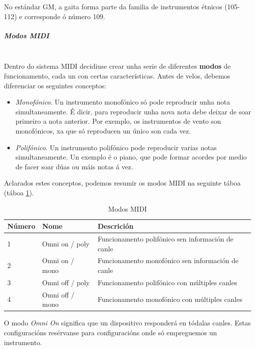     No estándar GM, a gaita forma parte da familia de instrumentos étnicos
    (105-112) e corresponde ó número 109.

    \subparagraph{Modos MIDI}\mbox{}\\

    Dentro do sistema MIDI decidiuse crear unha serie de diferentes
    \textbf{modos} de funcionamento, cada un con certas características. Antes
    de velos, debemos diferenciar os seguintes conceptos:

    \begin{itemize}
     \item \textit{Monofónico}. Un instrumento monofónico só pode reproducir
           unha nota simultaneamente. É dicir, para reproducir unha nova nota
           debe deixar de soar primeiro a nota anterior. Por exemplo, os
           instrumentos de vento son monofónicos, xa que só reproducen un único
           son cada vez.
     \item \textit{Polifónico}. Un instrumento polifónico pode reproducir
           varias notas simultaneamente. Un exemplo é o piano, que pode formar
           acordes por medio de facer soar dúas ou máis notas á vez.
    \end{itemize}

    Aclarados estes conceptos, podemos resumir os modos MIDI na seguinte táboa
    (táboa \ref{tabla:WikipediaModosMIDI}). \\

    \begin{table}[htbp]
     \centering
     \begin{tabular}{|l|l|l|}
      \hline
      \textbf{Número} & \textbf{Nome} & \textbf{Descrición} \\
      \hline
      1 & Omni on / poly & Funcionamento polifónico sen información de canle \\
      \hline
      2 & Omni on / mono & Funcionamento monofónico sen información de canle \\
      \hline
      3 & Omni off / poly & Funcionamento polifónico con múltiples canles \\
      \hline
      4 & Omni off / mono & Funcionamento monofónico con múltiples canles \\
      \hline
     \end{tabular}
     \caption{Modos MIDI}
     \label{tabla:WikipediaModosMIDI}  
    \end{table}

    O modo \textit{Omni On} significa que un dispositivo responderá en tódalas
    canles. Estas configuracións resérvanse para configuracións onde só
    empreguemos un instrumento. \\

